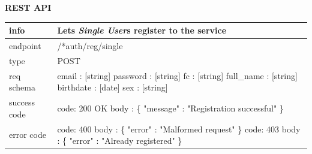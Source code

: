 \documentclass[titlepage]{article}
\begin{document}
\pagebreak

{\bf REST API}\\ 

\begin{tabularx}{\textwidth}{lX} \hline
    info & Lets {\it Single User}s register to the service \\ \hline
    endpoint & /*auth/reg/single \\ \hline
    type & POST \\ \hline
    req schema & 
        email : [string] \newline
        password : [string] \newline
        fc : [string] \newline
        full\_name : [string] \newline
        birthdate : [date] \newline
        sex : [string] \\ \hline
    success code &
        code: 200 OK \newline 
        body : \{ \newline
        "message" : "Registration successful" \newline
        \} \\ \hline
    error code &
        code: 400 \newline
        body : \{ "error" : "Malformed request" \} \newline \newline
        code: 403 \newline
        body : \{ "error" : "Already registered" \}  \\ \hline
\end{tabularx}

\vspace{\baselineskip}
\end{document}
